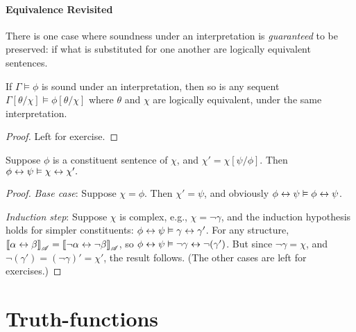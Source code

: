 \paragraph{Equivalence Revisited}
There is one case where soundness under an interpretation is \emph{guaranteed} to be preserved: if what is substituted for one another are logically equivalent sentences. \begin{theorem}[Equivalents] \label{equivalents}
	 If $\Gamma \vDash \phi$ is sound under an interpretation, then so is any sequent $\Gamma[\theta/\chi] \vDash \phi[\theta/\chi]$ where $\theta$ and $\chi$ are logically equivalent, under the same interpretation. \begin{proof}
Left for exercise.\end{proof}
\end{theorem}
\begin{theorem}[Equivalence]\label{tequiv}
	Suppose $\phi$ is a constituent sentence of $\chi$, and $\chi' = \chi[\psi/\phi]$. Then $\phi \leftrightarrow \psi \vDash \chi \leftrightarrow \chi'.$
	\begin{proof} \emph{Base case}: Suppose $\chi=\phi$. Then $\chi'=\psi$, and obviously $\phi\leftrightarrow\psi\vDash\phi\leftrightarrow\psi$.
	
	\emph{Induction step}: Suppose $\chi$ is complex, e.g., $\chi = \neg \gamma$, and the induction hypothesis holds for simpler constituents: $\phi\leftrightarrow\psi \vDash \gamma\leftrightarrow\gamma'$. For any structure, $\left\llbracket \alpha\leftrightarrow\beta\right\rrbracket_{\mathscr{A}} = \left\llbracket \neg\alpha \leftrightarrow \neg\beta\right\rrbracket_{\mathscr{A}}$, so $\phi\leftrightarrow\psi \vDash \neg\gamma\leftrightarrow\neg(\gamma')$. But since $\neg\gamma=\chi$, and $\neg(\gamma')=(\neg\gamma)'=\chi'$, the result follows. (The other cases are left for exercises.)
	\end{proof}
\end{theorem}

\section{Truth-functions}\label{truthfuncs}


